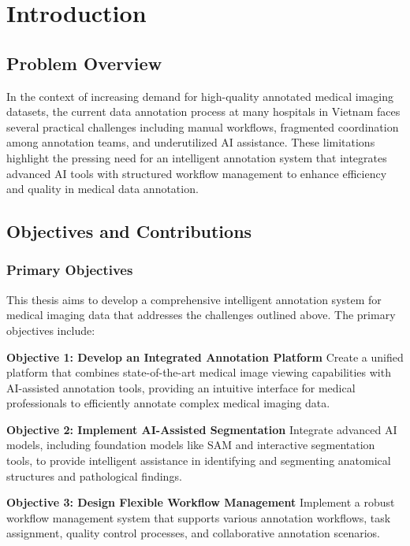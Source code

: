 \chapter{Introduction}

\section{Problem Overview}

In the context of increasing demand for high-quality annotated medical imaging datasets, the current data annotation process at many hospitals in Vietnam faces several practical challenges including manual workflows, fragmented coordination among annotation teams, and underutilized AI assistance. These limitations highlight the pressing need for an intelligent annotation system that integrates advanced AI tools with structured workflow management to enhance efficiency and quality in medical data annotation.

\section{Objectives and Contributions}

\subsection{Primary Objectives}

This thesis aims to develop a comprehensive intelligent annotation system for medical imaging data that addresses the challenges outlined above. The primary objectives include:

\textbf{Objective 1: Develop an Integrated Annotation Platform}
Create a unified platform that combines state-of-the-art medical image viewing capabilities with AI-assisted annotation tools, providing an intuitive interface for medical professionals to efficiently annotate complex medical imaging data.

\textbf{Objective 2: Implement AI-Assisted Segmentation}
Integrate advanced AI models, including foundation models like SAM and interactive segmentation tools, to provide intelligent assistance in identifying and segmenting anatomical structures and pathological findings.

\textbf{Objective 3: Design Flexible Workflow Management}
Implement a robust workflow management system that supports various annotation workflows, task assignment, quality control processes, and collaborative annotation scenarios.

